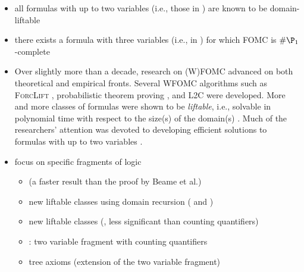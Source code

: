 \begin{itemize}
  \item all formulas with up to two variables (i.e., those in \FOtwo{}) are
        known to be domain-liftable \citep{DBLP:conf/nips/Broeck11}
  \item there exists a formula with three variables (i.e., in \FOthree{}) for
        which FOMC is $\#\P_{1}$-complete \citep{DBLP:conf/pods/BeameBGS15}
\end{itemize}


\begin{itemize}
  \item Over slightly more than a decade, research on (W)FOMC advanced on both
        theoretical and empirical fronts. Several WFOMC algorithms such as
        \textsc{ForcLift} \citep{DBLP:conf/ijcai/BroeckTMDR11}, probabilistic
        theorem proving \citep{DBLP:journals/cacm/GogateD16}, and \textsc{L2C}
        \citep{DBLP:conf/kr/KazemiP16} were developed. More and more classes of
        formulas were shown to be \emph{liftable}, i.e., solvable in polynomial
        time with respect to the size(s) of the domain(s)
        \citep{DBLP:conf/kr/BremenK21,DBLP:conf/nips/KazemiKBP16,DBLP:conf/lics/KuusistoL18,DBLP:journals/jair/Kuzelka21}.
        Much of the researchers' attention was devoted to developing efficient
        solutions to formulas with up to two variables
        \citep{DBLP:conf/uai/BremenK21,DBLP:journals/corr/abs-2110-05992}.
  \item focus on specific fragments of logic
        \begin{itemize}
          \item \FOtwo{} (a faster result than the proof by Beame
                et al.) \citep{DBLP:conf/uai/BremenK21}
          \item new liftable classes using domain recursion (\SFO{} and
                \SRU{}) \citep{DBLP:conf/nips/KazemiKBP16}
          \item new liftable classes (\Uone{}, less significant than counting
                quantifiers) \citep{DBLP:conf/lics/KuusistoL18}
          \item \Ctwo{}: two variable fragment with counting quantifiers
                \citep{DBLP:journals/jair/Kuzelka21,DBLP:journals/corr/abs-2110-05992}
          \item tree axioms (extension of the two variable fragment)

\end{itemize}
\end{itemize}
